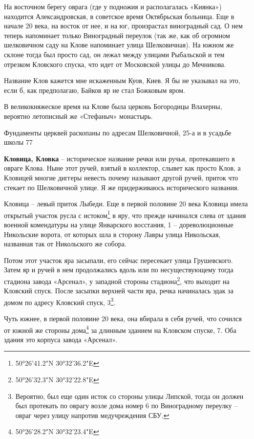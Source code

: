 На восточном берегу оврага (где у подножия и располагалась «Киянка») находится Александровская, в советское время Октябрьская больница. Еще в начале 20 века, на восток от нее, и на юг, произрастал виноградный сад. О нем теперь напоминает только Виноградный переулок (так же, как об огромном шелковичном саду на Клове напоминает улица Шелковичная). На южном же склоне тогда был просто сад, он лежал между улицами Рыбальской и тем отрезком Кловского спуска, что идет от Московской улицы до Мечникова.

Название Клов кажется мне искаженным Куов, Киев. Я бы не указывал на это, если б, как предполагаю, Байков яр не стал Божковым яром.

В великокняжеское время на Клове была церковь Богородицы Влахерны, вероятно летописный же «Стефаныч» монастырь. 

Фундаменты церквей раскопаны по адресам Шелковичной, 25-а и в усадьбе школы 77
\\ 


\medskip


\textbf{Кловица, Кловка} – историческое название речки или ручья, протекавшего в овраге Клова. Ныне этот ручей, взятый в коллектор, слывет как просто Клов, а Кловицей многие диггеры невесть почему называют другой ручей, приток что стекает по Шелковичной улице. Я же придерживаюсь исторического названия.

Кловица – левый приток Лыбеди. Еще в первой половине 20 века Кловица имела открытый участок русла с истоком\footnote{50°26'41.2"N 30°32'36.2"E} в яру, что прежде начинался слева от здания военной комендатуры на улице Январского восстания, 1 – дореволюционные Никольские ворота, от которых шла в сторону Лавры улица Никольская, названная так от Никольского же собора.

Потом этот участок яра засыпали, его сейчас пересекает улица Грушевского. Затем яр и ручей в нем продолжались вдоль или по несуществующему тогда стадиона завода «Арсенал», у западной стороны стадиона\footnote{50°26'32.3"N 30°32'22.8"E}, что выходит на Кловский спуск. После засыпки верхней части яра, речка начиналась эдак за домом по адресу Кловский спуск, 3\footnote{Вероятно, был еще один исток со стороны улицы Липской, тогда он должен был протекать по оврагу возле дома номер 6 по Виноградному переулку – овраг через улицу напротив медучреждения СБУ.}. 

Чуть южнее, в первой половине 20 века, она вбирала в себя ручей, что сочился от южной же стороны дома\footnote{50°26'28.2"N 30°32'23.4"E} за длинным зданием на Кловском спуске, 7. Оба здания это корпуса завода «Арсенал».

